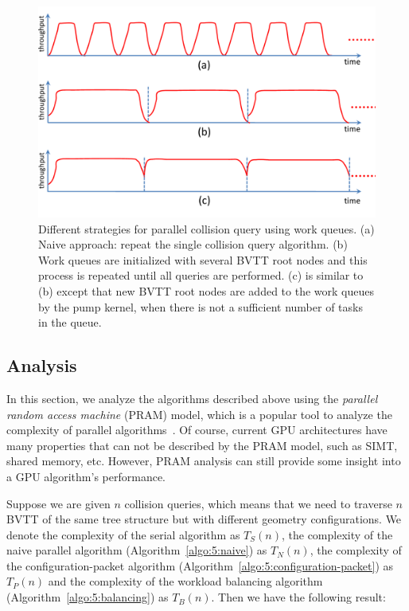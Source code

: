 \begin{figure}[htb]
  \centering
  \includegraphics[width=\linewidth]{figs/5/gproximity-parallel-differentcontrol.pdf}
  \caption[Different strategies for parallel collision query using work queues]{Different strategies for parallel collision query using work queues. (a) Naive approach: repeat the single collision query algorithm. (b) Work queues are initialized with several BVTT root nodes and this process is repeated until all queries are performed. (c) is similar to (b) except that new BVTT root nodes are added to the work queues by the pump kernel, when there is not a sufficient number of tasks in the queue.}
  \label{fig:5:gproximity-control}
\end{figure}


\subsection{Analysis}

In this section, we analyze the algorithms described above using the \emph{parallel random access machine} (PRAM) model, which is a popular tool to analyze the complexity of parallel algorithms~\cite{Joesphbook}. Of course, current GPU architectures have many properties that can not be described by the PRAM model, such as SIMT, shared memory, etc. However, PRAM analysis can still provide some insight into a GPU algorithm's performance.

Suppose we are given $n$ collision queries, which means that we need to traverse $n$ BVTT of the same tree structure but with different geometry configurations. We denote the complexity of the serial algorithm as $T_S(n)$, the complexity of the naive parallel algorithm (Algorithm~\ref{algo:5:naive}) as $T_N(n)$, the complexity of the configuration-packet algorithm (Algorithm~\ref{algo:5:configuration-packet}) as $T_P(n)$ and the complexity of the workload balancing algorithm (Algorithm~\ref{algo:5:balancing}) as $T_B(n)$. Then we have the following result:

